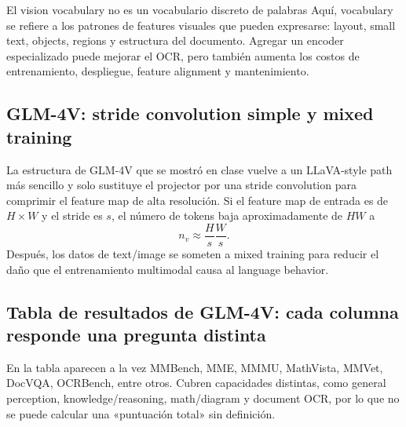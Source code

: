 
\begin{knowledgebox}{El vision vocabulary no es un vocabulario discreto de palabras}
Aquí, vocabulary se refiere a los patrones de features visuales que pueden expresarse: layout, small text, objects, regions y estructura del documento. Agregar un encoder especializado puede mejorar el OCR, pero también aumenta los costos de entrenamiento, despliegue, feature alignment y mantenimiento.
\end{knowledgebox}

\subsection{GLM-4V: stride convolution simple y mixed training}

La estructura de GLM-4V que se mostró en clase vuelve a un LLaVA-style path más sencillo y solo sustituye el projector por una stride convolution para comprimir el feature map de alta resolución. Si el feature map de entrada es de $H\times W$ y el stride es $s$, el número de tokens baja aproximadamente de $HW$ a
\[
n_v\approx \frac{H}{s}\frac{W}{s}.
\]
Después, los datos de text/image se someten a mixed training para reducir el daño que el entrenamiento multimodal causa al language behavior.



\subsection{Tabla de resultados de GLM-4V: cada columna responde una pregunta distinta}

En la tabla aparecen a la vez MMBench, MME, MMMU, MathVista, MMVet, DocVQA, OCRBench, entre otros. Cubren capacidades distintas, como general perception, knowledge/reasoning, math/diagram y document OCR, por lo que no se puede calcular una «puntuación total» sin definición.

